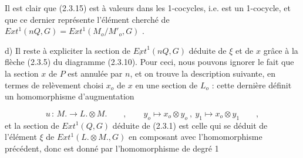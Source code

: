 
Il est clair que (2.3.15) est à valeurs dans les 1-cocycles, i.e. est un 1-cocycle, et que ce dernier représente l'élément cherché de $Ext^1(nQ,G) = Ext^1(M_o/M'_o,G)$ .

d) Il reste à expliciter la section de $\underline{Ext}^1(nQ,G)$ déduite de $\xi$ et de $x$ grâce à la flèche (2.3.5) du diagramme (2.3.10). Pour ceci, nous pouvons ignorer le fait que la section $x$ de $P$ est annulée par $n$, et on trouve la description suivante, en termes de relèvement choisi $x_o$ de $x$ en une section de $L_o$ : cette dernière définit un homomorphisme d'augmentation

\begin{equation*}
u \, : \, M. \longrightarrow L. \otimes M. \qquad , \qquad y_o \mapsto x_o \otimes y_o \ , \ y_1 \mapsto x_o \otimes y_1 \qquad ,
\end{equation*}
et la section de $Ext^1(Q,G)$ déduite de (2.3.1) est celle qui se déduit de l'élément $\xi$ de $Ext^1(L. \otimes M.,G)$ en composant avec l'homomorphisme précédent, donc est donné par l'homomorphisme de degré 1

